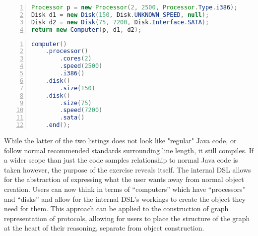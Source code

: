 \documentclass{article}
\begin{document}
	\begin{lstlisting}[label={lst:normalJavaAPI}, language=java, frame=single, numbers=left, caption=Object construction in a normal API\cite{Fowler:2010:DSL:1809745}]
Processor p = new Processor(2, 2500, Processor.Type.i386);
Disk d1 = new Disk(150, Disk.UNKNOWN_SPEED, null);
Disk d2 = new Disk(75, 7200, Disk.Interface.SATA);
return new Computer(p, d1, d2);

	\end{lstlisting}
	
\begin{lstlisting}[label={lst:intDSLJava}, language=java, frame=single, numbers=left, caption=Object construction in a method chained internal Domain Specific Language\cite{Fowler:2010:DSL:1809745}]
computer()
	.processor()
		.cores(2)
		.speed(2500)
		.i386()
	.disk()
		.size(150)
	.disk()
		.size(75)
		.speed(7200)
		.sata()
	.end();

	\end{lstlisting}
	While the latter of the two listings does not look like "regular" Java code, or follow normal recommended standards surrounding line length, it still compiles. If a wider scope than just the code samples relationship to normal Java code is taken however, the purpose of the exercise reveals itself. The internal DSL allows for the abstraction of expressing what the user wants away from normal object creation. Users can now think in terms of ``computers'' which have ``processors'' and ``disks'' and allow for the internal DSL's workings to create the object they need for them. This approach can be applied to the construction of graph representation of protocols, allowing for users to place the structure of the graph at the heart of their reasoning, separate from object construction.
	
\end{document}
